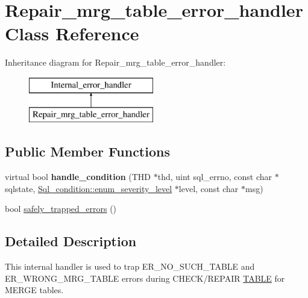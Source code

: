 \hypertarget{classRepair__mrg__table__error__handler}{}\section{Repair\+\_\+mrg\+\_\+table\+\_\+error\+\_\+handler Class Reference}
\label{classRepair__mrg__table__error__handler}
Inheritance diagram for Repair\+\_\+mrg\+\_\+table\+\_\+error\+\_\+handler\+:\begin{figure}[H]
\begin{center}
\leavevmode
\includegraphics[height=2.000000cm]{classRepair__mrg__table__error__handler}
\end{center}
\end{figure}
\subsection*{Public Member Functions}
\begin{DoxyCompactItemize}
\item 
\mbox{\label{classRepair__mrg__table__error__handler_a37fa25a830c2ae7fcdd19ff4bf23f987}} 
virtual bool {\bfseries handle\+\_\+condition} (T\+HD $\ast$thd, uint sql\+\_\+errno, const char $\ast$sqlstate, \mbox{\hyperlink{classSql__condition_ab0602581e19cddb609bfe10c44be4e83}{Sql\+\_\+condition\+::enum\+\_\+severity\+\_\+level}} $\ast$level, const char $\ast$msg)
\item 
bool \mbox{\hyperlink{classRepair__mrg__table__error__handler_afd9ca32003181b96c40dbfff28c0fbf6}{safely\+\_\+trapped\+\_\+errors}} ()
\end{DoxyCompactItemize}


\subsection{Detailed Description}
This internal handler is used to trap E\+R\+\_\+\+N\+O\+\_\+\+S\+U\+C\+H\+\_\+\+T\+A\+B\+LE and E\+R\+\_\+\+W\+R\+O\+N\+G\+\_\+\+M\+R\+G\+\_\+\+T\+A\+B\+LE errors during C\+H\+E\+C\+K/\+R\+E\+P\+A\+IR \mbox{\hyperlink{structTABLE}{T\+A\+B\+LE}} for M\+E\+R\+GE tables. 

